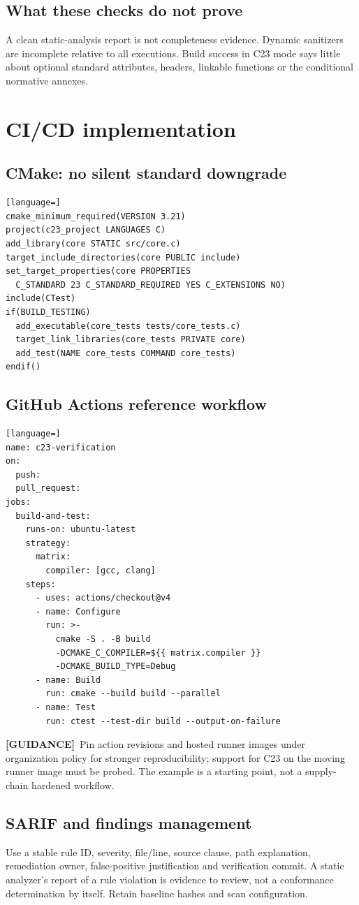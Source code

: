 \documentclass[10pt,letterpaper,oneside]{report}
\newcommand{\guidance}{\textbf{[GUIDANCE]}}
\begin{document}
\section{What these checks do not prove}
A clean static-analysis report is not completeness evidence. Dynamic sanitizers are incomplete relative to all executions. Build success in C23 mode says little about optional standard attributes, headers, linkable functions or the conditional normative annexes.
\chapter{CI/CD implementation}
\section{CMake: no silent standard downgrade}
\begin{lstlisting}[language=]
cmake_minimum_required(VERSION 3.21)
project(c23_project LANGUAGES C)
add_library(core STATIC src/core.c)
target_include_directories(core PUBLIC include)
set_target_properties(core PROPERTIES
  C_STANDARD 23 C_STANDARD_REQUIRED YES C_EXTENSIONS NO)
include(CTest)
if(BUILD_TESTING)
  add_executable(core_tests tests/core_tests.c)
  target_link_libraries(core_tests PRIVATE core)
  add_test(NAME core_tests COMMAND core_tests)
endif()
\end{lstlisting}
\section{GitHub Actions reference workflow}
\begin{lstlisting}[language=]
name: c23-verification
on:
  push:
  pull_request:
jobs:
  build-and-test:
    runs-on: ubuntu-latest
    strategy:
      matrix:
        compiler: [gcc, clang]
    steps:
      - uses: actions/checkout@v4
      - name: Configure
        run: >-
          cmake -S . -B build
          -DCMAKE_C_COMPILER=${{ matrix.compiler }}
          -DCMAKE_BUILD_TYPE=Debug
      - name: Build
        run: cmake --build build --parallel
      - name: Test
        run: ctest --test-dir build --output-on-failure
\end{lstlisting}
\guidance\ Pin action revisions and hosted runner images under organization policy for stronger reproducibility; support for C23 on the moving runner image must be probed. The example is a starting point, not a supply-chain hardened workflow.
\section{SARIF and findings management}
Use a stable rule ID, severity, file/line, source clause, path explanation, remediation owner, false-positive justification and verification commit. A static analyzer's report of a rule violation is evidence to review, not a conformance determination by itself. Retain baseline hashes and scan configuration.
\end{document}
